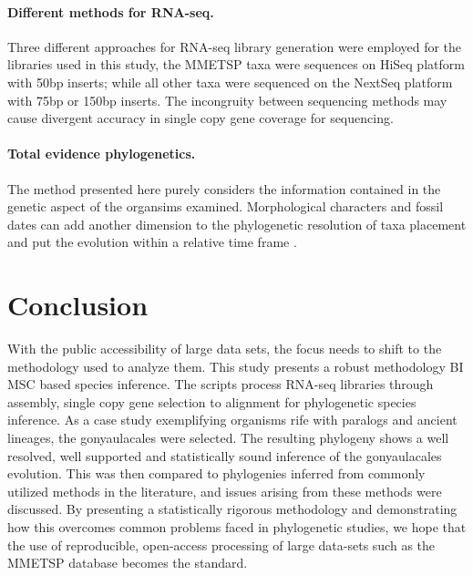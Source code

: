 \documentclass[12pt]{article}
\begin{document}
\paragraph*{Different methods for RNA-seq.} 
Three different approaches for RNA-seq library generation were employed for the libraries used in this study, the MMETSP taxa were sequences on HiSeq platform with 50bp inserts; while all other taxa were sequenced on the NextSeq platform with 75bp or 150bp inserts. 
The incongruity between sequencing methods may cause divergent accuracy in single copy gene coverage for sequencing.  
\paragraph*{Total evidence phylogenetics.}
The method presented here purely considers the information contained in the genetic aspect of the organsims examined. 
Morphological characters and fossil dates can add another dimension to the phylogenetic resolution of taxa placement and put the evolution within a relative time frame \cite{gavryushkina2017bayesian}.  

\newpage
\section{Conclusion}
With the public accessibility of large data sets, the focus needs to shift to the methodology used to analyze them. 
This study presents a robust methodology BI MSC based species inference. 
The scripts process RNA-seq libraries through assembly, single copy gene selection to alignment for phylogenetic species inference. 
As a case study exemplifying organisms rife with paralogs and ancient lineages, the gonyaulacales were selected. 
The resulting phylogeny shows a well resolved, well supported and statistically sound inference of the gonyaulacales evolution. 
This was then compared to phylogenies inferred from commonly utilized methods in the literature, and issues arising from these methods were discussed. 
By presenting a statistically rigorous methodology and demonstrating how this overcomes common problems faced in phylogenetic studies, we hope that the use of reproducible, open-access processing of large data-sets such as the MMETSP database becomes the standard.  
\newpage
\end{document}
